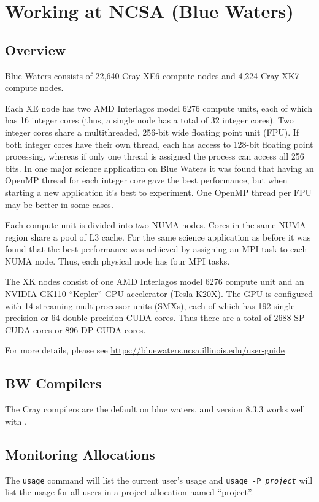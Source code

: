 \section{Working at NCSA (Blue Waters)}

\subsection{Overview}

Blue Waters consists of 22,640 Cray XE6 compute nodes and 4,224
Cray XK7 compute nodes.

Each XE node has two AMD Interlagos model 6276 compute units, each of
which has 16 integer cores (thus, a single node has a total of 32 integer
cores).  Two integer cores share a multithreaded, 256-bit wide floating 
point unit (FPU).  If both integer cores have their own thread, each has access 
to 128-bit floating point processing, whereas if only one thread is 
assigned the process can access all 256 bits.  In one major science
application on Blue Waters it was found that having an OpenMP thread for
each integer core gave the best performance, but when starting a new
application it's best to experiment.  One OpenMP thread per FPU may
be better in some cases.

Each compute unit is divided into two NUMA nodes.  Cores in
the same NUMA region share a pool of L3 cache.  For the same science
application as before it was found that the best performance was achieved
by assigning an MPI task to each NUMA node.  Thus, each physical node
has four MPI tasks.

The XK nodes consist of one AMD Interlagos model 6276 compute unit
and an NVIDIA GK110 ``Kepler'' GPU accelerator (Tesla K20X).  The
GPU is configured with 14 streaming multiprocessor units (SMXs), each
of which has 192 single-precision or 64 double-precision CUDA cores.  Thus
there are a total of 2688 SP CUDA cores or 896 DP CUDA cores.

For more details, please see 
\url{https://bluewaters.ncsa.illinois.edu/user-guide}

\subsection{BW Compilers}

The Cray compilers are the default on blue waters, and version
8.3.3 works well with \maestro.

\subsection{Monitoring Allocations}

The {\tt usage} command will list the current user's usage and 
{\tt usage -P {\em project}} will
list the usage for all users in a project allocation named ``project''.

